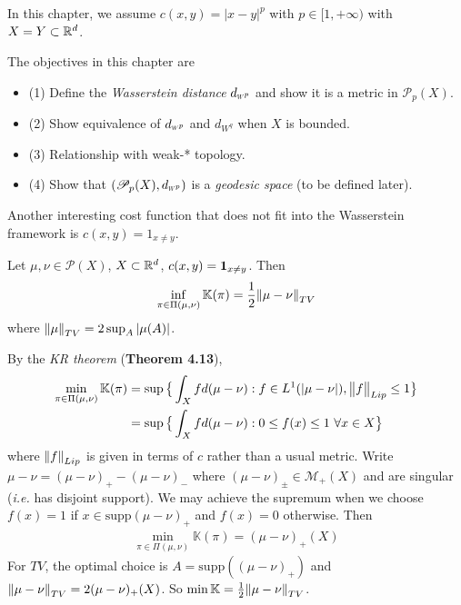 \documentclass[12pt,a4paper]{article}
\newenvironment{proof}
{\begin{changemargin}{1cm}{0.5cm} 
	}%
	{\end{changemargin}
}
\renewenvironment{i}
{\begin{itemize} 
	}%
	{\end{itemize}
}
\newenvironment{p}
{\begin{proof} 
	}%
	{\end{proof}
}
\begin{document}
In this chapter, we assume $c(x,y)  = |x-y|^p$ with $p\in [1, +\infty)$ with $X=Y \subset \mathbb{R}^d$.
\s

The objectives in this chapter are
\begin{i}
\item[(1)] Define the \emph{Wasserstein distance} $\wa{p}$ and show it is a metric in $\mathscr{P}_p(X)$.
\item[(2)] Show equivalence of $\wa{p}$ and $d_{W^q}$ when $X$ is bounded.
\item[(3)] Relationship with weak-* topology.
\item[(4)] Show that $(\mathscr{P}_p(X), \wa{p})$ is a \emph{geodesic space} (to be defined later).
\end{i}
\s

Another interesting cost function that does not fit into the Wasserstein framework is $c(x,y) = 1_{x\neq y}$.
\s

 Let $\mu, \nu \in \mathscr{P}(X)$, $X\subset \mathbb{R}^d$, $c(x,y) =\bm{1}_{x\neq y}$. Then
\begin{align*}
\inf_{\pi \in \Pi(\mu, \nu)} \mathbb{K}(\pi) = \frac{1}{2} \snorms{\mu - \nu}{TV}
\end{align*}
where $\snorms{\mu}{TV} = 2\sup_A |\mu(A)|$.
\begin{p}
\pf By the \emph{KR theorem} (\textbf{Theorem 4.13}),
\begin{align*}
\min_{\pi \in \Pi(\mu, \nu)} \mathbb{K}(\pi ) &= \sup \big\{ \int_X fd(\mu - \nu) : f\in L^1(|\mu-\nu|), \bigl\lVert f\bigr\rVert_{Lip} \leq 1 \big\} \\
&= \sup \big\{ \int_X fd(\mu - \nu) : 0\leq f(x)\leq 1 \,\, \forall x\in X \big\}
\end{align*}
where $\snorms{f}{Lip}$ is given in terms of $c$ rather than a usual metric. Write $\mu - \nu = (\mu - \nu)_+ - (\mu - \nu )_-$ where $(\mu - \nu )_{\pm} \in \mathscr{M}_+(X)$ and are singular (\textit{i.e.} has disjoint support). We may achieve the supremum when we choose $f(x) = 1$ if $x\in \text{supp}(\mu - \nu )_+$ and $f(x)=0$ otherwise. Then 
\begin{align*}
\min_{\pi \in \Pi(\mu, \nu)}\mathbb{K}(\pi) = (\mu - \nu )_+ (X)
\end{align*}
For $TV$, the optimal choice is $A = \text{supp}((\mu - \nu )_+)$ and $\snorms{\mu- \nu}{TV} =2(\mu - \nu )_+ (X)$. So $\min \mathbb{K} = \frac{1}{2} \snorms{\mu - \nu }{TV}$.

\eop
\end{p}
\end{document}
